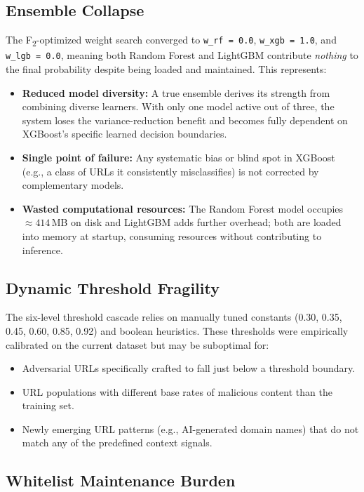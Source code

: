 \documentclass[12pt,a4paper]{article}
\begin{document}
\subsection{Ensemble Collapse}

The F\textsubscript{2}-optimized weight search converged to \texttt{w\_rf = 0.0}, \texttt{w\_xgb = 1.0}, and \texttt{w\_lgb = 0.0}, meaning both Random Forest and LightGBM contribute \textit{nothing} to the final probability despite being loaded and maintained. This represents:
\begin{itemize}
    \item \textbf{Reduced model diversity:} A true ensemble derives its strength from combining diverse learners. With only one model active out of three, the system loses the variance-reduction benefit and becomes fully dependent on XGBoost's specific learned decision boundaries.
    \item \textbf{Single point of failure:} Any systematic bias or blind spot in XGBoost (e.g., a class of URLs it consistently misclassifies) is not corrected by complementary models.
    \item \textbf{Wasted computational resources:} The Random Forest model occupies $\approx 414$\,MB on disk and LightGBM adds further overhead; both are loaded into memory at startup, consuming resources without contributing to inference.
\end{itemize}

\subsection{Dynamic Threshold Fragility}

The six-level threshold cascade relies on manually tuned constants (0.30, 0.35, 0.45, 0.60, 0.85, 0.92) and boolean heuristics. These thresholds were empirically calibrated on the current dataset but may be suboptimal for:
\begin{itemize}
    \item Adversarial URLs specifically crafted to fall just below a threshold boundary.
    \item URL populations with different base rates of malicious content than the training set.
    \item Newly emerging URL patterns (e.g., AI-generated domain names) that do not match any of the predefined context signals.
\end{itemize}

\subsection{Whitelist Maintenance Burden}
\end{document}
